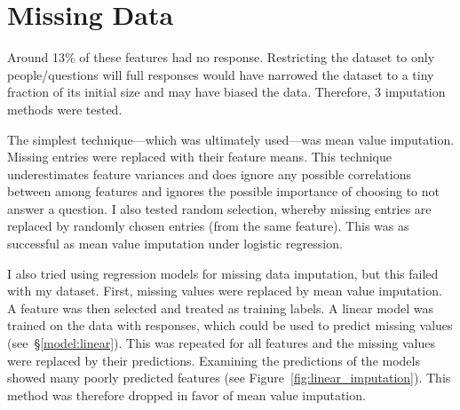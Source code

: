 \documentclass{article} %
\begin{document}
\section{Missing Data}
\label{sec:missing_data}
Around 13\% of these features had no response.  Restricting the dataset to only people/questions will full responses would have narrowed the dataset to a tiny fraction of its initial size and may have biased the data.  Therefore, 3 imputation methods were tested.

The simplest technique---which was ultimately used---was mean value imputation.  Missing entries were replaced with their feature means.  This technique underestimates feature variances and does ignore any possible correlations between among features and ignores the possible importance of choosing to not answer a question.  I also tested random selection, whereby missing entries are replaced by randomly chosen entries (from the same feature).  This was as successful as mean value imputation under logistic regression.

I also tried using regression models for missing data imputation, but this failed with my dataset.  First, missing values were replaced by mean value imputation.  A feature was then selected and treated as training labels. A linear model was trained on the data with responses, which could be used to predict missing values (see~\S\ref{model:linear}).  This was repeated for all features and the missing values were replaced by their predictions.  Examining the predictions of the models showed many poorly predicted features (see Figure~\ref{fig:linear_imputation}).  This method was therefore dropped in favor of mean value imputation.
\end{document}
